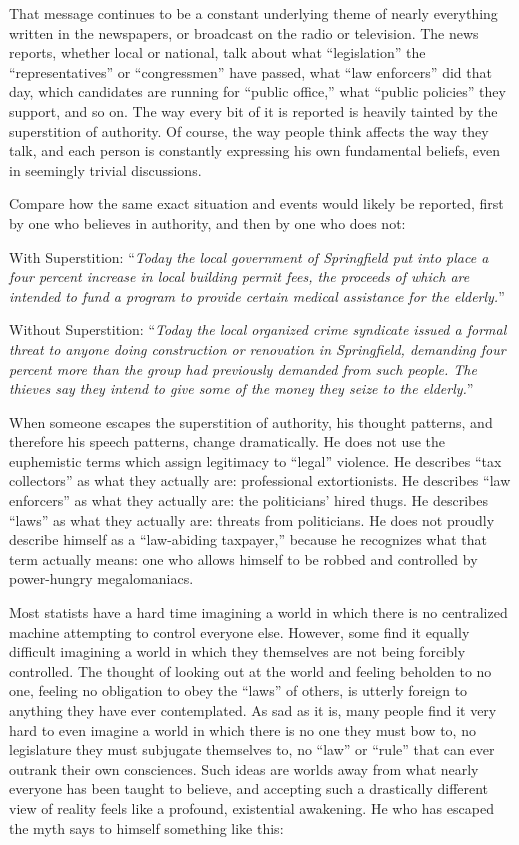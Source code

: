 \documentclass{book}
\begin{document}
That message continues to be a constant underlying theme of nearly everything written in the newspapers, or broadcast on the radio or television. The news reports, whether local or national, talk about what \enquote{legislation} the \enquote{representatives} or \enquote{congressmen} have passed, what \enquote{law enforcers} did that day, which candidates are running for \enquote{public office,} what \enquote{public policies} they support, and so on. The way every bit of it is reported is heavily tainted by the superstition of authority. Of course, the way people think affects the way they talk, and each person is constantly expressing his own fundamental beliefs, even in seemingly trivial discussions.

Compare how the same exact situation and events would likely be reported, first by one who believes in authority, and then by one who does not:

With Superstition: \enquote{\emph{Today the local government of Springfield put into place a four percent increase in local building permit fees, the proceeds of which are intended to fund a program to provide certain medical assistance for the elderly.}}

Without Superstition: \enquote{\emph{Today the local organized crime syndicate issued a formal threat to anyone doing construction or renovation in Springfield, demanding four percent more than the group had previously demanded from such people. The thieves say they intend to give some of the money they seize to the elderly.}}

When someone escapes the superstition of authority, his thought patterns, and therefore his speech patterns, change dramatically. He does not use the euphemistic terms which assign legitimacy to \enquote{legal} violence. He describes \enquote{tax collectors} as what they actually are: professional extortionists. He describes \enquote{law enforcers} as what they actually are: the politicians' hired thugs. He describes \enquote{laws} as what they actually are: threats from politicians. He does not proudly describe himself as a \enquote{law-abiding taxpayer,} because he recognizes what that term actually means: one who allows himself to be robbed and controlled by power-hungry megalomaniacs.

Most statists have a hard time imagining a world in which there is no centralized machine attempting to control everyone else. However, some find it equally difficult imagining a world in which they themselves are not being forcibly controlled. The thought of looking out at the world and feeling beholden to no one, feeling no obligation to obey the \enquote{laws} of others, is utterly foreign to anything they have ever contemplated. As sad as it is, many people find it very hard to even imagine a world in which there is no one they must bow to, no legislature they must subjugate themselves to, no \enquote{law} or \enquote{rule} that can ever outrank their own consciences. Such ideas are worlds away from what nearly everyone has been taught to believe, and accepting such a drastically different view of reality feels like a profound, existential awakening. He who has escaped the myth says to himself something like this:
\end{document}
